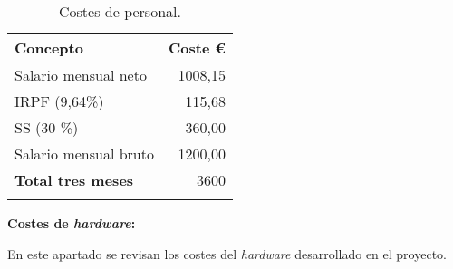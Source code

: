 \begin{longtable}[]{@{}lr@{}}
\toprule
\begin{minipage}[b]{0.38\columnwidth}\raggedright\strut
\textbf{Concepto}\strut
\end{minipage} & \begin{minipage}[b]{0.20\columnwidth}\raggedleft\strut
\textbf{Coste \euro{}}\strut
\end{minipage}\tabularnewline
\midrule
\endhead
\begin{minipage}[t]{0.38\columnwidth}\raggedright\strut
Salario mensual neto\strut
\end{minipage} & \begin{minipage}[t]{0.20\columnwidth}\raggedleft\strut
{1008,15}\strut
\end{minipage}\tabularnewline
\begin{minipage}[t]{0.38\columnwidth}\raggedright\strut
IRPF (9,64\%)\strut
\end{minipage} & \begin{minipage}[t]{0.20\columnwidth}\raggedleft\strut
115,68\strut
\end{minipage}\tabularnewline
\begin{minipage}[t]{0.38\columnwidth}\raggedright\strut
SS (30 \%)\strut
\end{minipage} & \begin{minipage}[t]{0.20\columnwidth}\raggedleft\strut
360,00\strut
\end{minipage}\tabularnewline
\begin{minipage}[t]{0.38\columnwidth}\raggedright\strut
Salario mensual bruto\strut
\end{minipage} & \begin{minipage}[t]{0.20\columnwidth}\raggedleft\strut
1200,00\strut
\end{minipage}\tabularnewline
\midrule
\begin{minipage}[t]{0.38\columnwidth}\raggedright\strut
\textbf{Total tres meses}\strut
\end{minipage} & \begin{minipage}[t]{0.20\columnwidth}\raggedleft\strut
3600\strut
\end{minipage}\tabularnewline
\bottomrule
\caption{Costes de personal.}
\end{longtable}

\textbf{Costes de \emph{hardware}:}

En este apartado se revisan los costes del \emph{hardware} desarrollado en el proyecto.

